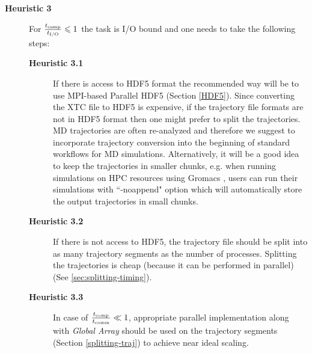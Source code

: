 \begin{description}
  \item[\textbf{Heuristic 3}] For $\frac{{t}_{\text{comp}}}{{t}_{\text{I/O}}} \leqslant 1$ the task is I/O bound and one needs to take the following steps:  
  \begin{description}
    \item[\textbf{Heuristic 3.1}] If there is access to HDF5 format the recommended way will be to use MPI-based Parallel HDF5 (Section \ref{HDF5}). Since converting the XTC file to HDF5 is expensive, if the trajectory file formats are not in HDF5 format then one might prefer to split the trajectories. MD trajectories are often re-analyzed and therefore we suggest to incorporate trajectory conversion into the beginning of standard workflows for MD simulations. 
 Alternatively, it will be a good idea to keep the trajectories in smaller chunks, e.g. when running simulations on HPC resources using Gromacs \cite{Gromacs3, Gromacs1}, users can run their simulations with ``-noappend" option which   will automatically store the output trajectories in small chunks.
    \item[\textbf{Heuristic 3.2}] If there is not access to HDF5, the trajectory file should be split into as many trajectory segments as the number of processes. Splitting the trajectories is cheap (because it can be performed in parallel) (See \ref{sec:splitting-timing}).
    \item[\textbf{Heuristic 3.3}] In case of $\frac{{t}_{\text{comp}}}{t_{\text{comm}}} \ll 1$, appropriate parallel implementation along with \emph{Global Array} should be used on the trajectory segments (Section \ref{splitting-traj}) to achieve near ideal scaling.
  \end{description}
\end{description}
